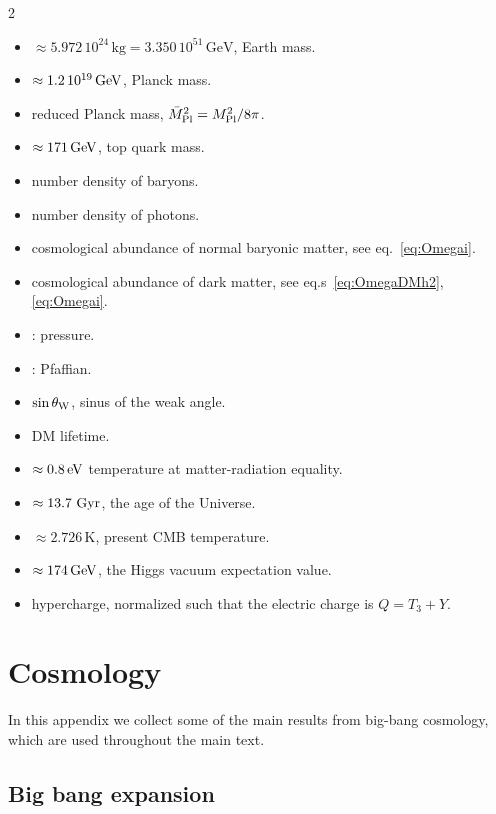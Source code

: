 \begin{multicols}{2}
\begin{itemize}
\item[$M_{\oplus}$] $\approx 5.972\,10^{24}\,\text{kg}=3.350\,10^{51}\,\text{GeV}$, Earth mass. 
\item[$M_{\rm Pl}$] $\approx 1.2 \,10^{19}\,{\rm GeV}$, Planck mass.
\item[$\bar{M}_{\rm Pl}$:] reduced Planck mass, $\bar{M}_{\rm Pl}^2 = {M}_{\rm Pl}^2/8\pi $.
\item[$M_t$] $\approx 171\,{\rm GeV}$, top quark mass.
\item[$n_{\rm b}$:]  number density of baryons.
\item[$n_{\gamma}$:]  number density of photons.
\item[$\Omega_{\rm b}$:] cosmological abundance of normal baryonic matter, see eq.~\eqref{eq:Omegai}.
\item[$\Omega_{\rm DM}$:] cosmological abundance of dark matter, see eq.s~\eqref{eq:OmegaDMh2}, \eqref{eq:Omegai}.
\item[$\wp$]: pressure.
\item[Pf]: Pfaffian.
 \item[$s_{\rm W}$:] $\sin\theta_{\rm W}$, sinus of the weak angle.
\item[$\tau$:] DM lifetime.
\item[$T_{\rm eq}$] $\approx 0.8\,{\rm eV}$ temperature at matter-radiation equality.
\item[$T_{\rm U}$] $\approx 13.7~{\rm Gyr}$, the age of the Universe.
\item[$T_0$] $\approx 2.726$\,K, present CMB temperature.
\item[$v$] $\approx 174\,{\rm GeV}$, the Higgs vacuum expectation value.
\item[$Y$:] hypercharge, normalized such that the electric charge is $Q=T_3+Y$.
\end{itemize}
\end{multicols}


\chapter{Cosmology}
\label{app:Cosmology}


In this appendix we collect some of the main results from big-bang cosmology, which are used throughout the main text.

\section{Big bang expansion}

